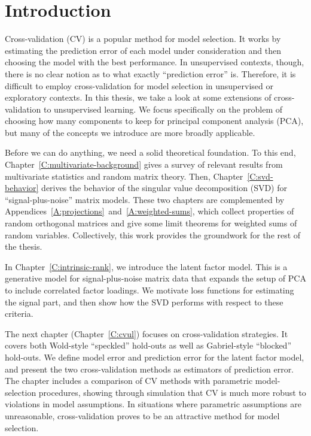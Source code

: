 \chapter{Introduction}

Cross-validation (CV) is a popular method for model selection.  It works by estimating the prediction error of each model under consideration and then choosing the model with the best performance.  In unsupervised contexts, though, there is no clear notion as to what exactly ``prediction error'' is.  Therefore, it is difficult to employ cross-validation for model selection in unsupervised or exploratory contexts.  In this thesis, we take a look at some extensions of cross-validation to unsupervised learning.  We focus specifically on the problem of choosing how many components to keep for principal component analysis (PCA), but many of the concepts we introduce are more broadly applicable.

Before we can do anything, we need a solid theoretical foundation.  To this end, Chapter~\ref{C:multivariate-background} gives a survey of relevant results from multivariate statistics and random matrix theory.  Then, Chapter~\ref{C:svd-behavior} derives the behavior of the singular value decomposition (SVD) for ``signal-plus-noise'' matrix models.  These two chapters are complemented by Appendices~\ref{A:projections}~and~\ref{A:weighted-sums}, which collect properties of random orthogonal matrices and give some limit theorems for weighted sums of random variables.  Collectively, this work provides the groundwork for the rest of the thesis.

In Chapter~\ref{C:intrinsic-rank}, we introduce the latent factor model.  This is a generative model for signal-plus-noise matrix data that expands the setup of PCA to include correlated factor loadings.  We motivate loss functions for estimating the signal part, and then show how the SVD performs with respect to these criteria.  

The next chapter (Chapter~\ref{C:cvul}) focuses on cross-validation strategies.  It covers both Wold-style ``speckled'' hold-outs as well as Gabriel-style ``blocked'' hold-outs.  We define model error and prediction error for the latent factor model, and present the two cross-validation methods as estimators of prediction error.  The chapter includes a comparison of CV methods with parametric model-selection procedures, showing through simulation that CV is much more robust to violations in model assumptions.  In situations where parametric assumptions are unreasonable, cross-validation proves to be an attractive method for model selection.

